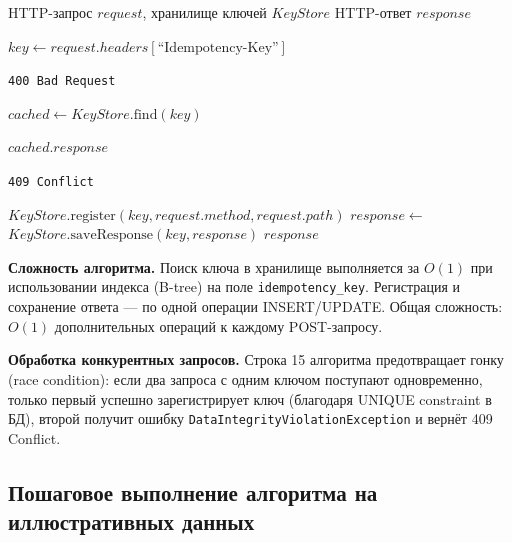 \begin{algorithm}[H]
\caption{Проверка идемпотентности HTTP-запроса}
\label{alg:idempotency-check}
\begin{algorithmic}[1]
\Require HTTP-запрос $request$, хранилище ключей $KeyStore$
\Ensure HTTP-ответ $response$

        \State \Return {} 
    \EndIf

    \State $key \gets request.headers[\text{``Idempotency-Key''}]$

        \State \Return \texttt{400 Bad Request} 
    \EndIf

    \State $cached \gets KeyStore.\text{find}(key)$

        \State \Return $cached.response$ 
    \EndIf

        \State \Return \texttt{409 Conflict} 
    \EndIf

    \State $KeyStore.\text{register}(key, request.method, request.path)$
    \State $response \gets$ 
    \State $KeyStore.\text{saveResponse}(key, response)$
    \State \Return $response$
\EndFunction
\end{algorithmic}
\end{algorithm}

\textbf{Сложность алгоритма.} Поиск ключа в хранилище выполняется за $O(1)$ при использовании индекса (B-tree) на поле \texttt{idempotency\_key}. Регистрация и сохранение ответа --- по одной операции INSERT/UPDATE. Общая сложность: $O(1)$ дополнительных операций к каждому POST-запросу.

\textbf{Обработка конкурентных запросов.} Строка 15 алгоритма предотвращает гонку (race condition): если два запроса с одним ключом поступают одновременно, только первый успешно зарегистрирует ключ (благодаря UNIQUE constraint в БД), второй получит ошибку \texttt{DataIntegrityViolationException} и вернёт 409 Conflict.

\subsection{Пошаговое выполнение алгоритма на иллюстративных данных}


